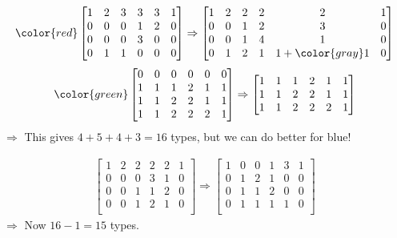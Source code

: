 \begin{frame}
        \begin{align*}
        \color{red}
        \begin{bmatrix}
             1&2&3&3&3&1\\
             0&0&0&1&2&0\\
             0&0&0&3&0&0\\
             0&1&1&0&0&0\\
        \end{bmatrix}\Rightarrow \begin{bmatrix}
            1&2&2&2&2&1\\
             0&0&1&2&3&0\\
             0&0&1&4&1&0\\
            0&1&2&1&1+\color{gray}1&0\\
        \end{bmatrix}
    \end{align*}
    \begin{align*}
    \color{green}
        \begin{bmatrix}
             0&0&0&0&0&0\\
             1&1&1&2&1&1\\
             1&1&2&2&1&1\\
             1&1&2&2&2&1\\
        \end{bmatrix}\Rightarrow
        \begin{bmatrix}
             1&1&1&2&1&1\\
             1&1&2&2&1&1\\
             1&1&2&2&2&1\\
        \end{bmatrix}
    \end{align*}
    $\Rightarrow$ This gives $4+5+4+3=16$ types, but we can do better for blue!
\end{frame}


\begin{frame}
\begin{align*}
    \begin{bmatrix}
        1&2&2&2&2&1\\
        0&0&0&3&1&0\\
        0&0&1&1&2&0\\
        0&0&1&2&1&0\\
    \end{bmatrix} \Rightarrow \begin{bmatrix}
	    1& 0& 0& 1& 3& 1\\
	    0& 1& 2& 1& 0& 0\\
	    0& 1& 1& 2& 0& 0\\
	    0& 1& 1& 1& 1& 0 \\
    \end{bmatrix}
	\end{align*}
    $\Rightarrow$ Now $16-1=15$ types.
\end{frame}


